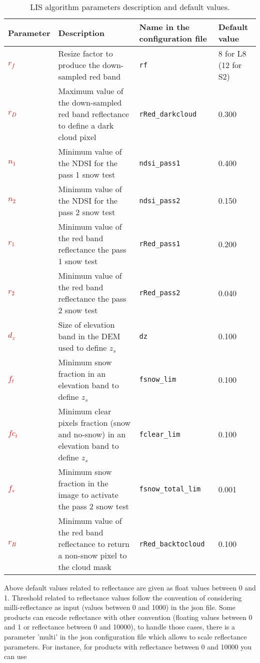 \documentclass[a4paper]{article}
\begin{document}
\begin{table}[!htbp]
\begin{center}
\begin{tabularx}{\textwidth}{|l X l l|}
\hline
Parameter & Description & Name in the configuration file & Default value\\
\hline
\textcolor{red}{$r_f$} & Resize factor to produce the down-sampled red band & \texttt{rf} & 8 for L8 (12 for S2) \\
\textcolor{red}{$r_D$} & Maximum value of the down-sampled red band reflectance to define a dark cloud pixel & \texttt{rRed\_darkcloud} & 0.300 \\
\textcolor{red}{$n_1$} & Minimum value of the NDSI for the pass 1 snow test & \texttt{ndsi\_pass1} & 0.400\\
\textcolor{red}{$n_2$} & Minimum value of the NDSI for the pass 2 snow test & \texttt{ndsi\_pass2} & 0.150\\
\textcolor{red}{$r_1$} & Minimum value of the red band reflectance the pass 1 snow test  & \texttt{rRed\_pass1} & 0.200 \\
\textcolor{red}{$r_2$} & Minimum value of the red band reflectance the pass 2 snow test  & \texttt{rRed\_pass2} & 0.040 \\
\textcolor{red}{$d_z$} & Size of elevation band in the DEM used to define $z_s$ & \texttt{dz} & 0.100 \\
\textcolor{red}{$f_t$} & Minimum snow fraction in an elevation band to define $z_s$ & \texttt{fsnow\_lim} & 0.100 \\
\textcolor{red}{$fc_t$} & Minimum clear pixels fraction (snow and no-snow) in an elevation band to define $z_s$ & \texttt{fclear\_lim} & 0.100 \\
\textcolor{red}{$f_s$} & Minimum snow fraction in the image to activate the pass 2 snow test & \texttt{fsnow\_total\_lim} & 0.001 \\
\textcolor{red}{$r_B$} & Minimum value of the red band reflectance to return a non-snow pixel to the cloud mask & \texttt{rRed\_backtocloud} & 0.100 \\
\hline
\end{tabularx}
\end{center}
\caption{LIS algorithm parameters description and default values.}
\end{table}\label{tab:param}

Above default values related to reflectance are given as float values between 0
and 1. Threshold related to reflectance values follow the convention of
considering milli-reflectance as input (values between 0 and 1000) in the json
file. Some products can encode reflectance with other convention (floating
values between 0 and 1 or reflectance between 0 and 10000), to handle those
cases, there is a parameter 'multi' in the json configuration file which allows
to scale reflectance parameters. For instance, for products with reflectance
between 0 and 10000 you can use
\end{document}

